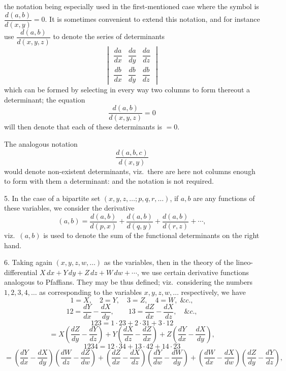 \documentclass[11pt,a4paper]{article}
\begin{document}
\newpage


the notation being especially used in the first-mentioned case where the symbol is $\dfrac{d(a, b)}{d(x, y)} = 0$. It is sometimes convenient to extend this notation, and for instance use $\dfrac{d(a, b)}{d(x, y, z)}$ to denote the series of determinants
\[
\begin{vmatrix} \dfrac{da}{dx} & \dfrac{da}{dy} & \dfrac{da}{dz} \\[1ex] \dfrac{db}{dx} & \dfrac{db}{dy} & \dfrac{db}{dz} \end{vmatrix}
\]
which can be formed by selecting in every way two columns to form thereout a determinant; the equation
\[
\frac{d(a, b)}{d(x, y, z)} = 0
\]
will then denote that each of these determinants is $= 0$.

The analogous notation
\[
\frac{d(a, b, c)}{d(x, y)}
\]
would denote non-existent determinants, viz.\ there are here not columns enough to form with them a determinant: and the notation is not required.

5. In the case of a bipartite set $(x, y, z, \ldots; p, q, r, \ldots)$, if $a, b$ are any functions of these variables, we consider the derivative
\[
(a, b) = \frac{d(a, b)}{d(p, x)} + \frac{d(a, b)}{d(q, y)} + \frac{d(a, b)}{d(r, z)} + \cdots,
\]
viz.\ $(a, b)$ is used to denote the sum of the functional determinants on the right hand.

6. Taking again $(x, y, z, w, \ldots)$ as the variables, then in the theory of the lineo-differential $X\,dx + Y\,dy + Z\,dz + W\,dw + \cdots$, we use certain derivative functions analogous to Pfaffians. They may be thus defined; viz.\ considering the numbers $1, 2, 3, 4, \ldots$ as corresponding to the variables $x, y, z, w, \ldots$ respectively, we have
\[
1 = X, \quad 2 = Y, \quad 3 = Z, \quad 4 = W, \;\&c.,
\]
\[
12 = \frac{dY}{dx} - \frac{dX}{dy}, \qquad 13 = \frac{dZ}{dx} - \frac{dX}{dz}, \quad \&c.,
\]
\[
123 = 1 \cdot 23 + 2 \cdot 31 + 3 \cdot 12
\]
\[
= X\left(\frac{dZ}{dy} - \frac{dY}{dz}\right) + Y\left(\frac{dX}{dz} - \frac{dZ}{dx}\right) + Z\left(\frac{dY}{dx} - \frac{dX}{dy}\right),
\]
\[
1234 = 12 \cdot 34 + 13 \cdot 42 + 14 \cdot 23
\]
\[
= \left(\frac{dY}{dx} - \frac{dX}{dy}\right)\!\left(\frac{dW}{dz} - \frac{dZ}{dw}\right) + \left(\frac{dZ}{dx} - \frac{dX}{dz}\right)\!\left(\frac{dY}{dw} - \frac{dW}{dy}\right) + \left(\frac{dW}{dx} - \frac{dX}{dw}\right)\!\left(\frac{dZ}{dy} - \frac{dY}{dz}\right),
\]

\newpage
\end{document}
